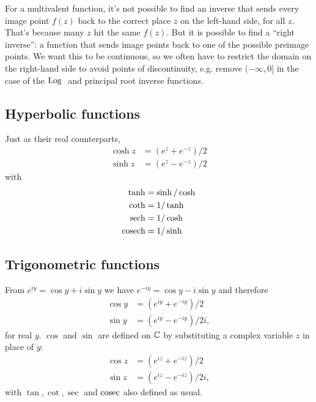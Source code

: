 \documentclass[12pt]{article}
\begin{document}
For a multivalent function, it's not possible to find an inverse that sends
every image point $f(z)$ back to the correct place $z$ on the left-hand side,
for all $z$. That's because many $z$ hit the same $f(z)$. But it is possible to
find a ``right inverse'': a function that sends image points back to one of the
possible preimage points. We want this to be continuous, so we often have to
restrict the domain on the right-hand side to avoid points of discontinuity,
e.g. remove $(-\infty, 0]$ in the case of the $\text{Log}~$ and principal root inverse
functions.

\subsection*{Hyperbolic functions}

Just as their real counterparts,
\begin{align*}
  \cosh z &= (e^z + e^{-z})/2\\
  \sinh z &= (e^z - e^{-z})/2
\end{align*}
with
\begin{align*}
  \tanh &= \sinh/\cosh\\
  \coth &= 1/\tanh\\
  \operatorname{\text{sech}} &= 1/\cosh\\
  \operatorname{\text{cosech}} &= 1/\sinh
\end{align*}

\subsection*{Trigonometric functions}

From $e^{iy} = \cos y + i \sin y$ we have $e^{-iy} = \cos y - i \sin y$ and therefore
\begin{align*}
  \cos y &= (e^{iy} + e^{-iy})/2\\
  \sin y &= (e^{iy} - e^{-iy})/2i,
\end{align*}
for real $y$. $\cos$ and $\sin$ are defined on $\mathbb{C}$ by substituting a complex
variable $z$ in place of $y$:
\begin{align*}
  \cos z &= (e^{iz} + e^{-iz})/2\\
  \sin z &= (e^{iz} - e^{-iz})/2i,
\end{align*}
with $\tan, \cot, \sec$ and $\operatorname{\text{cosec}}$ also defined as usual.
\end{document}
